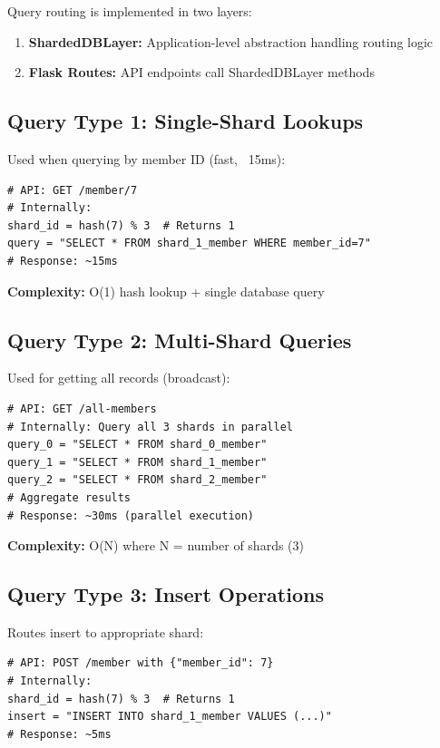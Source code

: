 \documentclass[12pt,a4paper]{article}
\begin{document}
Query routing is implemented in two layers:

\begin{enumerate}
    \item \textbf{ShardedDBLayer:} Application-level abstraction handling routing logic
    \item \textbf{Flask Routes:} API endpoints call ShardedDBLayer methods
\end{enumerate}

\subsection{Query Type 1: Single-Shard Lookups}

Used when querying by member ID (fast, ~15ms):

\begin{lstlisting}[caption=Single-Shard Query Example]
# API: GET /member/7
# Internally:
shard_id = hash(7) % 3  # Returns 1
query = "SELECT * FROM shard_1_member WHERE member_id=7"
# Response: ~15ms
\end{lstlisting}

\textbf{Complexity:} O(1) hash lookup + single database query

\subsection{Query Type 2: Multi-Shard Queries}

Used for getting all records (broadcast):

\begin{lstlisting}[caption=Multi-Shard Broadcast]
# API: GET /all-members
# Internally: Query all 3 shards in parallel
query_0 = "SELECT * FROM shard_0_member"
query_1 = "SELECT * FROM shard_1_member"
query_2 = "SELECT * FROM shard_2_member"
# Aggregate results
# Response: ~30ms (parallel execution)
\end{lstlisting}

\textbf{Complexity:} O(N) where N = number of shards (3)

\subsection{Query Type 3: Insert Operations}

Routes insert to appropriate shard:

\begin{lstlisting}[caption=Routed Insert]
# API: POST /member with {"member_id": 7}
# Internally:
shard_id = hash(7) % 3  # Returns 1
insert = "INSERT INTO shard_1_member VALUES (...)"
# Response: ~5ms
\end{lstlisting}
\end{document}
